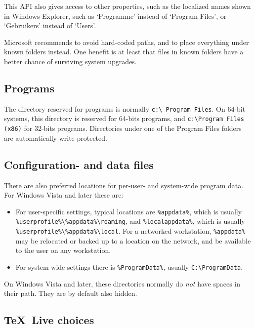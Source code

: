 \documentclass[11pt,a4paper,oneside]{report}
\def\TL{\TeX~Live}
\let\bsl\textbackslash
\def\bslb{\bsl\discretionary{}{}{}}
\begin{document}
This API also gives access to other properties, such as the
localized names shown in Windows Explorer, such as `Programme'
instead of `Program Files', or `Gebruikers' instead of `Users'.

Microsoft recommends to avoid hard-coded paths, and to place
everything under known folders instead. One benefit is at least that
files in known folders have a better chance of surviving system
upgrades.

\subsection{Programs}
\label{sec:knownprogs}

The directory reserved for programs is normally \texttt{c:\bslb
  Program Files}. On 64-bit systems, this directory is reserved for
64-bits programs, and \texttt{c:\bslb Program Files (x86)} for
32-bits programs. Directories under one of the Program Files folders
are automatically write-protected.

\subsection{Configuration- and data files}
\label{sec:known_configs}

There are also preferred locations for per-user- and system-wide
program data. For Windows Vista and later these are:
\begin{itemize}
\item {\sloppy For user-specific settings, typical locations are
  \texttt{\%appdata\%}, which is usually
  \texttt{\%userprofile\%\bslb \%appdata\%\bslb roaming}, and
  \texttt{\%localappdata\%}, which is usually
  \texttt{\%userprofile\%\bslb \%appdata\%\bslb local}. For a
  networked workstation, \texttt{\%appdata\%} may be relocated or
  backed up to a location on the network, and be available to the
  user on any workstation.\par}
\item {\sloppy For system-wide settings there is \texttt{\%ProgramData\%},
  usually \texttt{C:\bsl ProgramData}.\par}
\end{itemize}
On Windows Vista and later, these directories normally do \emph{not}
have spaces in their path. They are by default also hidden.

\subsection{\TL{} choices}
\label{sec:known_tl}
\end{document}
